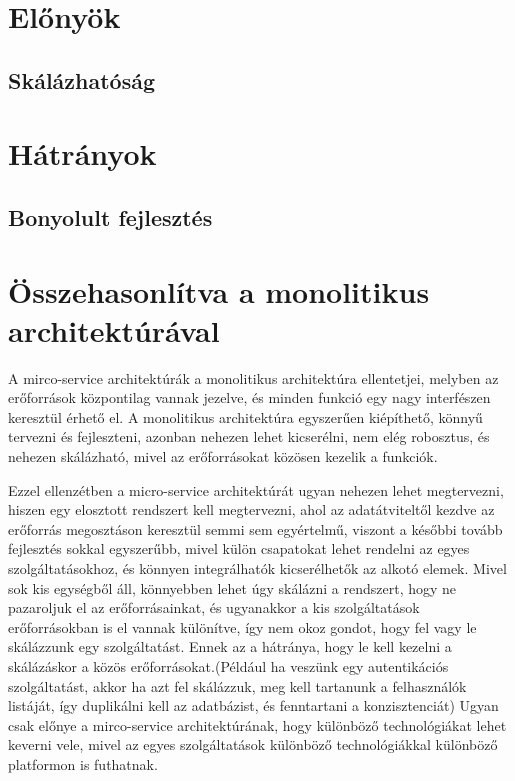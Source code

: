 \documentclass[11pt,magyar,a4paper,oneside,]{report}
\begin{document}
\chapter{Előnyök}\label{elux151nyuxf6k}

\section{Skálázhatóság}\label{skuxe1luxe1zhatuxf3suxe1g}

\chapter{Hátrányok}\label{huxe1truxe1nyok}

\section{Bonyolult fejlesztés}\label{bonyolult-fejlesztuxe9s}

\chapter{Összehasonlítva a monolitikus
architektúrával}\label{uxf6sszehasonluxedtva-a-monolitikus-architektuxfaruxe1val}

A mirco-service architektúrák a monolitikus architektúra ellentetjei,
melyben az erőforrások központilag vannak jezelve, és minden funkció egy
nagy interfészen keresztül érhető el. A monolitikus architektúra
egyszerűen kiépíthető, könnyű tervezni és fejleszteni, azonban nehezen
lehet kicserélni, nem elég robosztus, és nehezen skálázható, mivel az
erőforrásokat közösen kezelik a funkciók.

Ezzel ellenzétben a micro-service architektúrát ugyan nehezen lehet
megtervezni, hiszen egy elosztott rendszert kell megtervezni, ahol az
adatátviteltől kezdve az erőforrás megosztáson keresztül semmi sem
egyértelmű, viszont a későbbi tovább fejlesztés sokkal egyszerűbb, mivel
külön csapatokat lehet rendelni az egyes szolgáltatásokhoz, és könnyen
integrálhatók kicserélhetők az alkotó elemek. Mivel sok kis egységből
áll, könnyebben lehet úgy skálázni a rendszert, hogy ne pazaroljuk el az
erőforrásainkat, és ugyanakkor a kis szolgáltatások erőforrásokban is el
vannak különítve, így nem okoz gondot, hogy fel vagy le skálázzunk egy
szolgáltatást. Ennek az a hátránya, hogy le kell kezelni a skálázáskor a
közös erőforrásokat.(Például ha veszünk egy autentikációs szolgáltatást,
akkor ha azt fel skálázzuk, meg kell tartanunk a felhasználók listáját,
így duplikálni kell az adatbázist, és fenntartani a konzisztenciát)
Ugyan csak előnye a mirco-service architektúrának, hogy különböző
technológiákat lehet keverni vele, mivel az egyes szolgáltatások
különböző technológiákkal különböző platformon is futhatnak.
\end{document}
